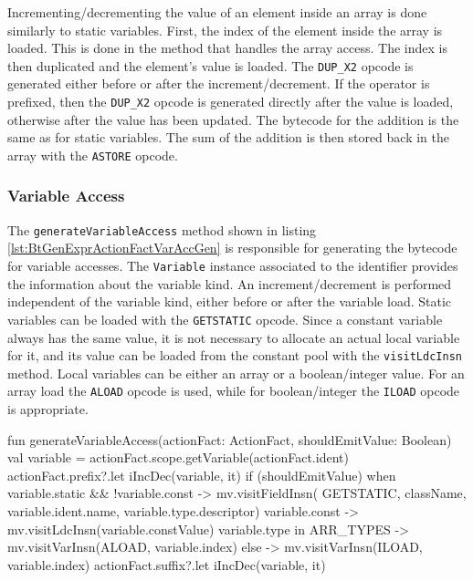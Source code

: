 Incrementing/decrementing the value of an element inside an array is done similarly to static variables. First, the index of the element inside the array is loaded. This is done in the method that handles the array access. The index is then duplicated and the element's value is loaded. The \verb|DUP_X2| opcode is generated either before or after the increment/decrement. If the operator is prefixed, then the \verb|DUP_X2| opcode is generated directly after the value is loaded, otherwise after the value has been updated. The bytecode for the addition is the same as for static variables. The sum of the addition is then stored back in the array with the \verb|ASTORE| opcode. 

\subsubsection{Variable Access}

The \verb|generateVariableAccess| method shown in listing \ref{lst:BtGenExprActionFactVarAccGen} is responsible for generating the bytecode for variable accesses. The \verb|Variable| instance associated to the identifier provides the information about the variable kind. An increment/decrement is performed independent of the variable kind, either before or after the variable load. Static variables can be loaded with the \verb|GETSTATIC| opcode. Since a constant variable always has the same value, it is not necessary to allocate an actual local variable for it, and its value can be loaded from the constant pool with the \verb|visitLdcInsn| method. Local variables can be either an array or a boolean/integer value. For an array load the \verb|ALOAD| opcode is used, while for boolean/integer the \verb|ILOAD| opcode is appropriate. 


\begin{KotlinCode}[float,numbers=none,caption=Implementation of the \texttt{generateVariableAccess} method of the \texttt{ActionFactGenerator}., label=lst:BtGenExprActionFactVarAccGen]
fun generateVariableAccess(actionFact: ActionFact, shouldEmitValue: Boolean) {
    val variable = actionFact.scope.getVariable(actionFact.ident)
    actionFact.prefix?.let {   iIncDec(variable, it)    }
    if (shouldEmitValue) {
        when {
            variable.static && !variable.const -> mv.visitFieldInsn(
                GETSTATIC, className, variable.ident.name, variable.type.descriptor)
            variable.const -> mv.visitLdcInsn(variable.constValue)
            variable.type in ARR_TYPES -> mv.visitVarInsn(ALOAD, variable.index)
            else -> mv.visitVarInsn(ILOAD, variable.index)
        }
    }
    actionFact.suffix?.let {   iIncDec(variable, it)    }
}
\end{KotlinCode}

